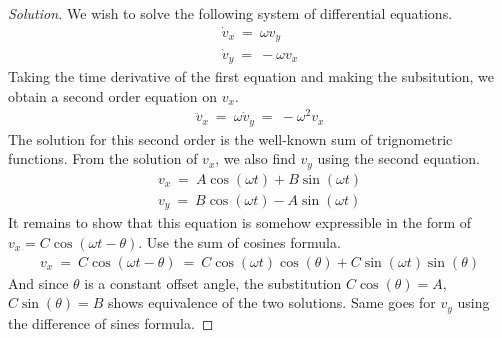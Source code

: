 \documentclass{article}
\numberwithin{equation}{section}
\begin{document}
\begin{proof}[Solution]
    We wish to solve the following system of differential equations. 
    \begin{eqnarray}
        \dot v_x \ = \ \omega v_y \\ 
        \dot v_y \ = \ -\omega v_x
    \end{eqnarray}
    Taking the time derivative of the first equation and making the subsitution, 
    we obtain a second order equation on $v_x$. 
    \begin{eqnarray}
        \ddot v_x \ = \ \omega \dot v_y \ = \ -\omega^2 v_x
    \end{eqnarray}
    The solution for this second order is the well-known sum of trignometric functions. 
    From the solution of $v_x$, we also find $v_y$ using the second equation. 
    \begin{eqnarray}
        v_x \ = \ A \cos(\omega t) + B\sin(\omega t) \\ 
        v_y \ = \ B\cos(\omega t) - A \sin(\omega t)
    \end{eqnarray}
    It remains to show that this equation is somehow expressible in 
    the form of $v_x = C\cos(\omega t - \theta)$. Use the sum of cosines formula. 
    \begin{eqnarray}
        v_x \ = \ C\cos(\omega t - \theta) \ = \ 
        C \cos(\omega t) \cos(\theta) + C \sin(\omega t)\sin(\theta)
    \end{eqnarray}
    And since $\theta$ is a constant offset angle, the substitution 
    $C\cos(\theta) = A$, $C\sin(\theta) = B$ shows equivalence of the two 
    solutions. Same goes for $v_y$ using the difference of sines formula. 
    
\end{proof}
\end{document}
